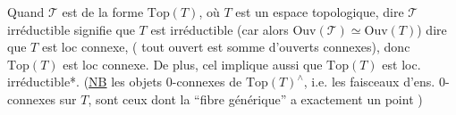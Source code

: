 Quand $\mathscr T$ est de la forme  $\mathrm{Top}(T)$, où $T$ est un espace topologique, dire $\mathscr T$ irréductible signifie que $T$ est irréductible (car alors $\mathrm{Ouv}(\mathscr T)\simeq\mathrm{Ouv}(T)$\deleted{\unsure{\})}})\unsure{;}   dire  que $T$ est loc connexe,
 ( tout ouvert est somme  d'ouverts connexes), donc $\mathrm{Top}(T)$ est loc connexe. De plus, cel implique aussi que $\mathrm{Top}(T)$ est loc. irréductible*. (\uline{NB} les objets 0-connexes
de $\mathrm{Top}(T)^\wedge$, i.e. les faisceaux d'ens.  0-connexes sur $T$, sont ceux dont la ``fibre générique'' a exactement un point )

